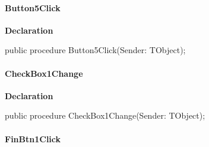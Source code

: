 \documentclass{report}
\newif\ifpdf
\begin{document}
\paragraph*{Button5Click}\hspace*{\fill}

\label{igobase.TIWizFrm-Button5Click}
\begin{list}{}{
\setlength{\itemindent}{0cm}
\setlength{\listparindent}{0cm}
\setlength{\leftmargin}{\evensidemargin}
\addtolength{\leftmargin}{\tmplength}
\settowidth{\labelsep}{X}
\addtolength{\leftmargin}{\labelsep}
\setlength{\labelwidth}{\tmplength}
}
\item[\textbf{Declaration}\hfill]
\ifpdf
\begin{flushleft}
\fi
\begin{ttfamily}
public procedure Button5Click(Sender: TObject);\end{ttfamily}

\ifpdf
\end{flushleft}
\fi

\end{list}
\paragraph*{CheckBox1Change}\hspace*{\fill}

\label{igobase.TIWizFrm-CheckBox1Change}
\begin{list}{}{
\setlength{\itemindent}{0cm}
\setlength{\listparindent}{0cm}
\setlength{\leftmargin}{\evensidemargin}
\addtolength{\leftmargin}{\tmplength}
\settowidth{\labelsep}{X}
\addtolength{\leftmargin}{\labelsep}
\setlength{\labelwidth}{\tmplength}
}
\item[\textbf{Declaration}\hfill]
\ifpdf
\begin{flushleft}
\fi
\begin{ttfamily}
public procedure CheckBox1Change(Sender: TObject);\end{ttfamily}

\ifpdf
\end{flushleft}
\fi

\end{list}
\paragraph*{FinBtn1Click}\hspace*{\fill}
\end{document}

